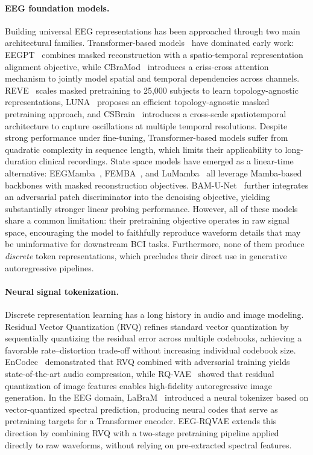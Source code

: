 \documentclass{article}
\begin{document}
\paragraph{EEG foundation models.}
Building universal EEG representations has been approached through two main architectural families.
Transformer-based models~\citep{NIPS2017_3f5ee243} have dominated early work: EEGPT~\citep{NEURIPS2024_4540d267} combines masked reconstruction with a spatio-temporal representation alignment objective, while CBraMod~\citep{wang2025cbramod} introduces a criss-cross attention mechanism to jointly model spatial and temporal dependencies across channels.
REVE~\citep{ouahidi2026reve} scales masked pretraining to 25,000 subjects to learn topology-agnostic representations, LUNA~\citep{doner2025luna} proposes an efficient topology-agnostic masked pretraining approach, and CSBrain~\citep{zhou2026csbrain} introduces a cross-scale spatiotemporal architecture to capture oscillations at multiple temporal resolutions.
Despite strong performance under fine-tuning, Transformer-based models suffer from quadratic complexity in sequence length, which limits their applicability to long-duration clinical recordings.
State space models have emerged as a linear-time alternative: EEGMamba~\citep{WANG2025107816}, FEMBA~\citep{DBLP:journals/corr/abs-2502-06438}, and LuMamba~\citep{unknown2} all leverage Mamba-based backbones with masked reconstruction objectives.
BAM-U-Net~\citep{bamunnet2026} further integrates an adversarial patch discriminator into the denoising objective, yielding substantially stronger linear probing performance.
However, all of these models share a common limitation: their pretraining objective operates in raw signal space, encouraging the model to faithfully reproduce waveform details that may be uninformative for downstream BCI tasks.
Furthermore, none of them produce \emph{discrete} token representations, which precludes their direct use in generative autoregressive pipelines.

\paragraph{Neural signal tokenization.}
Discrete representation learning has a long history in audio and image modeling.
Residual Vector Quantization (RVQ) refines standard vector quantization by sequentially quantizing the residual error across multiple codebooks, achieving a favorable rate--distortion trade-off without increasing individual codebook size.
EnCodec~\citep{défossez2022highfidelityneuralaudio} demonstrated that RVQ combined with adversarial training yields state-of-the-art audio compression, while RQ-VAE~\citep{9879532} showed that residual quantization of image features enables high-fidelity autoregressive image generation.
In the EEG domain, LaBraM~\citep{jiang2024large} introduced a neural tokenizer based on vector-quantized spectral prediction, producing neural codes that serve as pretraining targets for a Transformer encoder.
EEG-RQVAE extends this direction by combining RVQ with a two-stage pretraining pipeline applied directly to raw waveforms, without relying on pre-extracted spectral features.
\end{document}

